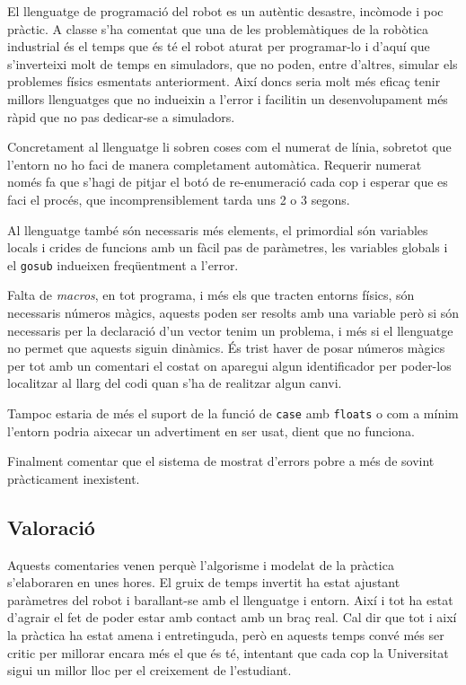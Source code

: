 El llenguatge de programació del robot es un autèntic desastre, incòmode i
poc pràctic. A classe s'ha comentat que una de les problemàtiques de la robòtica 
industrial és el temps que és té el robot aturat per programar-lo i 
d'aquí que s'inverteixi molt de temps en simuladors, que no poden, entre d'altres, simular
els problemes físics esmentats anteriorment. Així doncs seria molt més
eficaç tenir millors llenguatges que no indueixin a l'error i facilitin
un desenvolupament més ràpid que no pas dedicar-se a simuladors.

Concretament al llenguatge li sobren coses com el numerat de línia,
sobretot que l'entorn no ho faci de manera completament automàtica.
Requerir numerat només fa que s'hagi de pitjar el botó de re-enumeració
cada cop i esperar que es faci el procés, que incomprensiblement tarda
uns 2 o 3 segons.

Al llenguatge també són necessaris més elements, el primordial són
variables locals i crides de funcions amb un fàcil pas de paràmetres,
les variables globals i el \texttt{gosub} indueixen freqüentment a l'error.

Falta de \emph{macros}, en tot programa, i més els que tracten entorns físics,
són necessaris números màgics, aquests poden ser resolts amb una variable
però si són necessaris per la declaració d'un vector tenim un problema,
i més si el llenguatge no permet que aquests siguin dinàmics. És
trist haver de posar números màgics per tot amb un comentari el costat
on aparegui algun identificador per poder-los localitzar al llarg del codi
quan s'ha de realitzar algun canvi.

Tampoc estaria de més el suport de la funció de \texttt{case} amb \texttt{floats} 
o com a mínim l'entorn podria aixecar un advertiment en ser usat, dient que no funciona.

Finalment comentar que el sistema de mostrat d'errors pobre a més de sovint
pràcticament inexistent.

\subsection{Valoració}
Aquests comentaries venen perquè l'algorisme i modelat de la pràctica s'elaboraren
en unes hores. El gruix de temps invertit ha estat ajustant paràmetres del robot i barallant-se
amb el llenguatge i entorn. Així i tot ha estat d'agrair el fet de poder estar amb contact amb un braç
real. Cal dir que tot i així la pràctica ha estat amena i entretinguda, però en aquests
temps convé més ser critic per millorar encara més el que és té, intentant que cada cop la Universitat
sigui un millor lloc per el creixement de l'estudiant.

